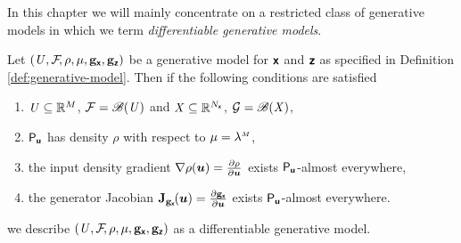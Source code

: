 
In this chapter we will mainly concentrate on a restricted class of generative models in which we term \emph{differentiable generative models}.

\begin{definition}\label{def:differentiable-generative-model}
Let $(\mathit{U},\mathcal{F}\kern-2pt,\rho,\mu,{\mathbf{g}}_{\boldsymbol{\mathsf{x}}},{\mathbf{g}}_{\boldsymbol{\mathsf{z}}})$ be a generative model for $\boldsymbol{\mathsf{x}}$ and $\boldsymbol{\mathsf{z}}$ as specified in Definition \ref{def:generative-model}. Then if the following conditions are satisfied
\begin{enumerate}
\item
$\mathit{U} \subseteq \mathbb{R}^M$, $\mathcal{F} = \mathscr{B}(\mathit{U})$ and $\mathit{X} \subseteq \mathbb{R}^{N_{\boldsymbol{\mathsf{x}}}}$, $\mathcal{G} = \mathscr{B}(\mathit{X})$, %
\item
$\mathsf{P}_{\boldsymbol{\mathsf{u}}}$ has density $\rho$ with respect to $\mu = \lebm{M}$, 
\item
the input density gradient $\grad{\rho}{\vct{u}} = \pd{\rho}{\vct{u}}$ exists $\mathsf{P}_{\boldsymbol{\mathsf{u}}}$-almost everywhere, 
\item
the generator Jacobian $\jacob{\genfunc_{\rvct{x}}}{\vct{u}} = \pd{\genfunc_{\rvct{x}}}{\vct{u}}$ exists $\mathsf{P}_{\boldsymbol{\mathsf{u}}}$-almost everywhere.
\end{enumerate}
we describe $(\mathit{U},\mathcal{F}\kern-2pt,\rho,\mu,{\mathbf{g}}_{\boldsymbol{\mathsf{x}}},{\mathbf{g}}_{\boldsymbol{\mathsf{z}}})$ as a differentiable generative model.
\end{definition}


